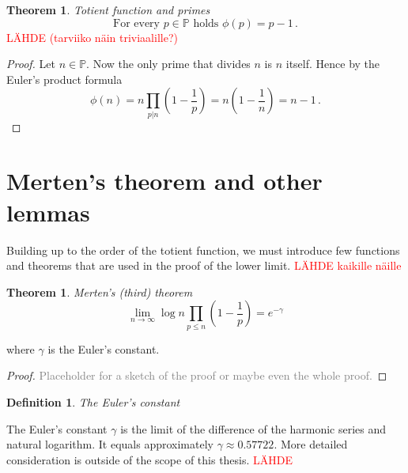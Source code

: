\documentclass{article}
\theoremstyle{definition}
\newtheorem{definition}[subsubsection]{Definition}
\newtheorem{theorem}[subsubsection]{Theorem}
\begin{document}
\begin{theorem}{\emph{Totient function and primes}}
\label{thm:phiprime}
\begin{equation*}
    \text{For every } p \in \mathbb{P} \text{ holds } \phi(p) = p-1\,.
\end{equation*}
\textcolor{red}{LÄHDE (tarviiko näin triviaalille?)}

\begin{proof}

Let $n\in\mathbb{P}$. Now the only prime that divides $n$ is $n$ itself. Hence by the Euler's product formula
\begin{equation*}
    \phi(n) = n \prod_{p \vert n} \left(1 - \frac{1}{p}\right) = n\left(1-\frac{1}{n}\right) = n-1\,.
\end{equation*}

\end{proof}

\end{theorem}

\section{Merten's theorem and other lemmas}

Building up to the order of the totient function, we must introduce few functions and theorems that are used in the proof of the lower limit.
\textcolor{red}{LÄHDE kaikille näille}

\begin{theorem}{\emph{Merten's (third) theorem}}
\label{thm:mertens}
\begin{equation*}
    \lim_{n \rightarrow \infty} \log n \prod_{p\leq n} \left(1-\frac{1}{p}\right) = e^{-\gamma}
\end{equation*}

where $\gamma$ is the Euler's constant.

\begin{proof}

\textcolor{gray}{Placeholder for a sketch of the proof or maybe even the whole proof.}

\end{proof}

\end{theorem}

\begin{definition}{\emph{The Euler's constant}}

The Euler's constant $\gamma$ is the limit of the difference of the harmonic series and natural logarithm. It equals approximately $\gamma\approx 0.57722$. More detailed consideration is outside of the scope of this thesis.
\textcolor{red}{LÄHDE}
\end{definition}
\end{document}
